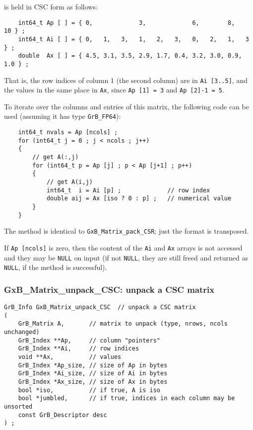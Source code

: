 \documentclass[12pt]{article}
\begin{document}
is held in CSC form as follows:

{\footnotesize
\begin{verbatim}
    int64_t Ap [ ] = { 0,             3,             6,        8,       10 } ;
    int64_t Ai [ ] = { 0,   1,   3,   1,   2,   3,   0,   2,   1,   3   } ;
    double  Ax [ ] = { 4.5, 3.1, 3.5, 2.9, 1.7, 0.4, 3.2, 3.0, 0.9, 1.0 } ; \end{verbatim} }

That is, the row indices of column 1 (the second column) are in
\verb'Ai [3..5]', and the values in the same place in \verb'Ax',
since \verb'Ap [1] = 3' and \verb'Ap [2]-1 = 5'.

To iterate over the columns and entries of this matrix, the following code can
be used
(assuming it has type \verb'GrB_FP64'):

    {\footnotesize
    \begin{verbatim}
    int64_t nvals = Ap [ncols] ;
    for (int64_t j = 0 ; j < ncols ; j++)
    {
        // get A(:,j)
        for (int64_t p = Ap [j] ; p < Ap [j+1] ; p++)
        {
            // get A(i,j)
            int64_t  i = Ai [p] ;             // row index
            double aij = Ax [iso ? 0 : p] ;   // numerical value
        }
    } \end{verbatim}}

The method is identical to \verb'GxB_Matrix_pack_CSR'; just the format is
transposed.

If \verb'Ap [ncols]' is zero, then the content of the \verb'Ai' and \verb'Ax' arrays
is not accessed and they may be \verb'NULL' on input (if not \verb'NULL', they
are still freed and returned as \verb'NULL', if the method is successful).

\newpage
\subsubsection{{\sf GxB\_Matrix\_unpack\_CSC:} unpack a CSC matrix}
\label{matrix_unpack_csc}

\begin{mdframed}[userdefinedwidth=6in]
{\footnotesize
\begin{verbatim}
GrB_Info GxB_Matrix_unpack_CSC  // unpack a CSC matrix
(
    GrB_Matrix A,       // matrix to unpack (type, nrows, ncols unchanged)
    GrB_Index **Ap,     // column "pointers"
    GrB_Index **Ai,     // row indices
    void **Ax,          // values
    GrB_Index *Ap_size, // size of Ap in bytes
    GrB_Index *Ai_size, // size of Ai in bytes
    GrB_Index *Ax_size, // size of Ax in bytes
    bool *iso,          // if true, A is iso
    bool *jumbled,      // if true, indices in each column may be unsorted
    const GrB_Descriptor desc
) ;
\end{verbatim}
} \end{mdframed}
\end{document}
